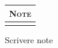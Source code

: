 \begin{minipage}[t][\textheight][t]{\textwidth}
    \vspace*{\fill}

    \begin{tabularx}{\linewidth}{X}
    {\Large \textsc{Note}} \\ \hline \hline \\
    \end{tabularx}
	Scrivere note
    
\end{minipage}